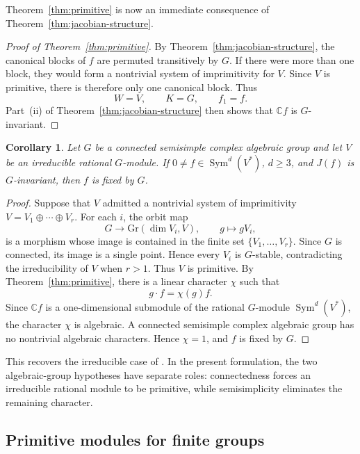\documentclass[11pt,reqno]{amsart}
\numberwithin{equation}{section}
\newtheorem{corollary}[theorem]{Corollary}
\theoremstyle{definition}
\theoremstyle{remark}
\newcommand{\C}{\mathbb C}
\newcommand{\Sym}{\operatorname{Sym}}
\begin{document}
Theorem~\ref{thm:primitive} is now an immediate consequence of Theorem~\ref{thm:jacobian-structure}.

\begin{proof}[Proof of Theorem~\ref{thm:primitive}]
By Theorem~\ref{thm:jacobian-structure}, the canonical blocks of $f$
are permuted transitively by $G$.  If there were more than one block,
they would form a nontrivial system of imprimitivity for $V$.
Since $V$ is primitive, there is therefore only one canonical block.
Thus
\[
  W=V,\qquad K=G,\qquad f_1=f.
\]
Part~\textup{(ii)} of
Theorem~\ref{thm:jacobian-structure} then shows that $\C f$ is
$G$-invariant.
\end{proof}


\begin{corollary}\label{cor:connected-semisimple}
Let $G$ be a connected semisimple complex algebraic group and let $V$
be an irreducible rational $G$-module.  If
$0\ne f\in\Sym^d(V^*)$, $d\geq3$, and $J(f)$ is $G$-invariant, then
$f$ is fixed by $G$.
\end{corollary}

\begin{proof}
Suppose that $V$ admitted a nontrivial system of imprimitivity $V=V_1\oplus\cdots\oplus V_r$. For each $i$, the orbit map
\[
  G\longrightarrow \mathrm{Gr}(\dim V_i,V),
  \qquad
  g\longmapsto gV_i,
\]
is a morphism whose image is contained in the finite set
$\{V_1,\ldots,V_r\}$.  Since $G$ is connected, its image is a
single point.  Hence every $V_i$ is $G$-stable, contradicting the
irreducibility of $V$ when $r>1$.  Thus $V$ is primitive. By Theorem~\ref{thm:primitive}, there is a linear character $\chi$
such that
\[
  g\cdot f=\chi(g)f.
\]
Since $\C f$ is a one-dimensional submodule of the rational
$G$-module $\Sym^d(V^*)$, the character $\chi$ is algebraic.
A connected semisimple complex algebraic group has no nontrivial
algebraic characters.  Hence $\chi=1$, and $f$ is fixed by $G$.
\end{proof}


This recovers the irreducible case of
\cite[Theorem~1]{Kempf}.  In the present formulation, the two
algebraic-group hypotheses have separate roles: connectedness forces
an irreducible rational module to be primitive, while semisimplicity
eliminates the remaining character.


\subsection{Primitive modules for finite groups}
\end{document}

